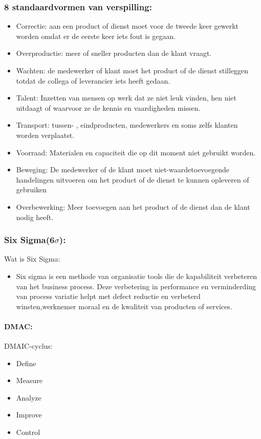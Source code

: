 \documentclass[12pt]{article}
\begin{document}
\subsubsection{8 standaardvormen van verspilling:}
\begin{itemize}
    \item Correctie: aan een product of dienst moet voor de tweede keer gewerkt worden omdat er de eerste keer iets fout is gegaan.
    \item Overproductie: meer of sneller producten dan de klant vraagt.
    \item Wachten: de medewerker of klant moet het product of de dienst stilleggen totdat de collega of leverancier iets heeft gedaan.
    \item Talent: Inzetten van mensen op werk dat ze niet leuk vinden, hen niet uitdaagt of waarvoor ze de kennis en vaardigheden missen.
    \item Transport: tussen- , eindproducten, medewerkers en soms zelfs klanten worden verplaatst.
    \item Voorraad: Materialen en capaciteit die op dit moment niet gebruikt worden.
    \item Beweging: De medewerker of de klant moet niet-waardetoevoegende handelingen uitvoeren om het product of de dienst te kunnen opleveren of gebruiken
    \item Overbewerking: Meer toevoegen aan het product of de dienst dan de klant nodig heeft.
\end{itemize}
\subsubsection{Six Sigma(6$\sigma$):}
Wat is Six Sigma:\begin{itemize}
    \item Six sigma is een methode van organisatie tools die de kapabiliteit verbeteren van het business process. Deze verbetering in performance en verminderding van process variatie helpt met defect reductie en verbeterd winsten,werknemer moraal en de kwaliteit van producten of services.
\end{itemize}
\paragraph{DMAC:}
DMAIC-cyclus:\begin{itemize}
    \item Define 
    \item Measure 
    \item Analyze 
    \item Improve 
    \item Control
\end{itemize}
\end{document}
